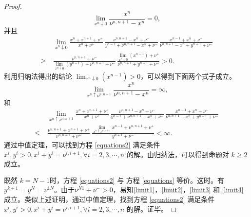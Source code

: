 \begin{proof}
\begin{equation}
        \lim_{x^{n}\downarrow 0}\frac{x^{n}}{\nu^{n,n+1}-x^{n}}=0,
    \end{equation}
    并且
    \begin{equation}\label{limit2}
        \begin{split}
            &\;\lim_{x^{n}\downarrow 0}\frac{x^{n}+x^{n+1}+\nu^+}{x^{n}+\nu^+}\,\frac{\nu^{n,n+1}-x^{n}+\nu^-}{y^{n-1}+\nu^{n,n+1}-x^{n}+\nu^-}\,\frac{x^{n-1}+x^{n}+\nu^+}{\nu^{n,n+1}-x^{n}+y^{n+1}+\nu^-}\\
            \ge &\;\frac{\nu^{n,n+1}+\nu^-}{\lim_{x^{n}\downarrow 0}(y^{n-1})+\nu^{n,n+1}+\nu^-}\,\frac{\lim_{x^{n}\downarrow 0}(x^{n-1})+\nu^+}{\nu^{n,n+1}+y^{n+1}+\nu^-}>0.
        \end{split}
    \end{equation}
    利用归纳法得出的结论 $\lim_{x^{n}\downarrow 0}(x^{n-1})>0$，可以得到下面两个式子成立。
    \begin{equation}\label{limit3}
        \lim_{x^{n}\uparrow \nu^{n,n+1}}\frac{x^{n}}{\nu^{n,n+1}-x^{n}}=\infty,
    \end{equation}
    和
    \begin{equation}\label{limit4}
        \begin{split}
            &\;\lim_{x^{n}\uparrow \nu^{n,n+1}}\frac{x^{n}+x^{n+1}+\nu^+}{x^{n}+\nu^+}\,\frac{\nu^{n,n+1}-x^{n}+\nu^-}{y^{n-1}+\nu^{n,n+1}-x^{n}+\nu^-}\,\frac{x^{n-1}+x^{n}+\nu^+}{\nu^{n,n+1}-x^{n}+y^{n+1}+\nu^-}\\
            \le &\;\frac{\nu^{n,n+1}+x^{n+1}+\nu^+}{\nu^{n,n+1}+\nu^+}\,\frac{\lim_{x^{n}\uparrow \nu^{n,n+1}}x^{n-1}+\nu^{n,n+1}+\nu^+}{y^{n+1}+\nu^-}<\infty.
        \end{split}
    \end{equation}
    通过中值定理，可以找到方程 \eqref{equations2} 满足条件 $x^{i},y^i>0, x^{i}+y^{i}=\nu^{i,i+1}, \forall i=2,3, \cdots, n$ 的解。由归纳法，可以得到命题对 $k\ge 2$ 成立。

    既然 $k=N-1$时，方程 \eqref{equations2} 与 方程 \eqref{equations} 等价。这时。有$y^{k+1}=y^N=\nu^{1N}$。由于$\nu^{N1}+\nu^->0$，易知\eqref{limit1}，\eqref{limit2}，\eqref{limit3} 和 \eqref{limit4} 成立。类似上述证明，通过中值定理，找到方程 \eqref{equations2} 满足条件 $x^{i},y^i>0, x^{i}+y^{i}=\nu^{i,i+1}, \forall i=2,3, \cdots, n$ 的解。证毕。
\end{proof}

